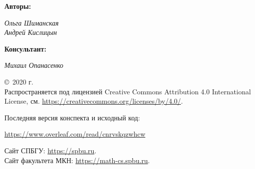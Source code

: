 \vspace{1.5cm}

\noindent
\begin{minipage}[t]{0.5\textwidth}
	\noindent 
	\textbf{\large Авторы:}
	
	\vspace{0.33cm}
	
	\noindent 
	\textit{Ольга Шиманская\\
	Андрей Кислицын}
	
    \vspace{1.5cm}
    
    \noindent \textbf{\large Консультант:}
	
	\vspace{0.33cm}
	
	\noindent \textit{Михаил Опанасенко}

\end{minipage}

\vfill

\noindent \copyright\ 2020 г.\\
Распространяется под лицензией Creative Commons Attribution 4.0 International License, см. \url{https://creativecommons.org/licenses/by/4.0/}.

\vfill

\noindent Последняя версия конспекта и исходный код: 

\begin{center}
	\url{https://www.overleaf.com/read/cnrvskqzwhcw}
\end{center}

\scriptsize\noindent Сайт СПБГУ: \url{https://spbu.ru}. \\
Сайт факультета МКН: \url{https://math-cs.spbu.ru}.

\normalsize
